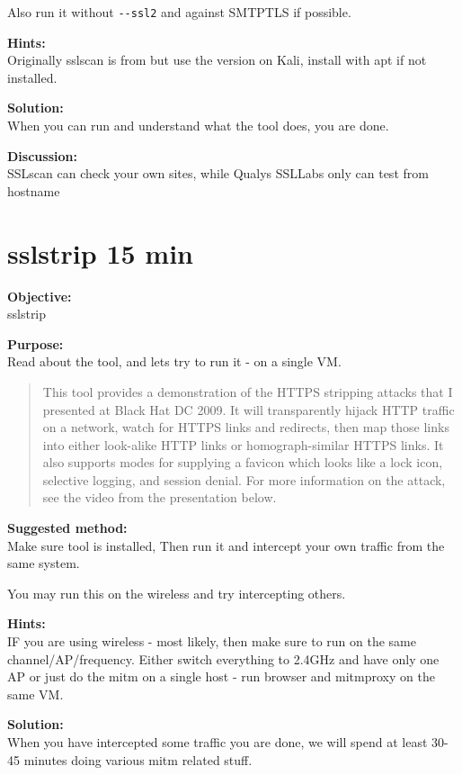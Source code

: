 \documentclass[a4paper,11pt,notitlepage]{report}
\begin{document}
Also run it without \verb+--ssl2+ and against SMTPTLS if possible.

{\bf Hints:}\\
Originally sslscan is from  but use the version on Kali, install with apt if not installed.

{\bf Solution:}\\
When you can run and understand what the tool does, you are done.

{\bf Discussion:}\\
SSLscan can check your own sites, while Qualys SSLLabs only can test from hostname


\chapter{sslstrip 15 min}
\label{ex:sslstrip}

{\bf Objective:}\\
sslstrip 

{\bf Purpose:}\\
Read about the tool, and lets try to run it - on a single VM.

\begin{quote}
This tool provides a demonstration of the HTTPS stripping attacks that I presented at Black Hat DC 2009. It will transparently hijack HTTP traffic on a network, watch for HTTPS links and redirects, then map those links into either look-alike HTTP links or homograph-similar HTTPS links. It also supports modes for supplying a favicon which looks like a lock icon, selective logging, and session denial. For more information on the attack, see the video from the presentation below.
\end{quote}

{\bf Suggested method:}\\
Make sure tool is installed, Then run it and intercept your own traffic from the same system.

You may run this on the wireless and try intercepting others.

{\bf Hints:}\\
IF you are using wireless - most likely, then make sure to run on the same channel/AP/frequency. Either switch everything to 2.4GHz and have only one AP or just do the mitm on a single host - run browser and mitmproxy on the same VM.

{\bf Solution:}\\
When you have intercepted some traffic you are done, we will spend at least 30-45 minutes doing various mitm related stuff.
\end{document}
